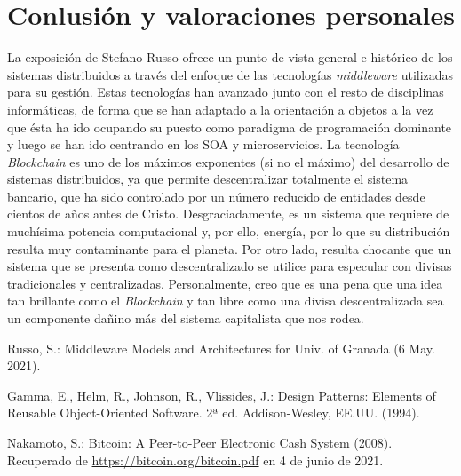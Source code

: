 \documentclass[runningheads]{llncs}
\begin{document}
\section{Conlusión y valoraciones personales}

La exposición de Stefano Russo ofrece un punto de vista general e histórico de los sistemas distribuidos a través del enfoque de las tecnologías \textit{middleware} utilizadas para su gestión.
Estas tecnologías han avanzado junto con el resto de disciplinas informáticas, de forma que se han adaptado a la orientación a objetos a la vez que ésta ha ido ocupando su puesto como paradigma de programación dominante y luego se han ido centrando en los SOA y microservicios.
La tecnología \textit{Blockchain} es uno de los máximos exponentes (si no el máximo) del desarrollo de sistemas distribuidos, ya que permite descentralizar totalmente el sistema bancario, que ha sido controlado por un número reducido de entidades desde cientos de años antes de Cristo.
Desgraciadamente, es un sistema que requiere de muchísima potencia computacional y, por ello, energía, por lo que su distribución resulta muy contaminante para el planeta.
Por otro lado, resulta chocante que un sistema que se presenta como descentralizado se utilice para especular con divisas tradicionales y centralizadas.
Personalmente, creo que es una pena que una idea tan brillante como el \textit{Blockchain} y tan libre como una divisa descentralizada sea un componente dañino más del sistema capitalista que nos rodea.

\begin{thebibliography}{8}
	Russo, S.: Middleware Models and Architectures for Univ\@. of Granada (6 May. 2021).

	Gamma, E., Helm, R., Johnson, R., Vlissides, J.: Design Patterns: Elements of Reusable Object-Oriented Software. 2ª ed. Addison-Wesley, EE\@.UU\@. (1994).

	Nakamoto, S.: Bitcoin: A Peer-to-Peer Electronic Cash System (2008). Recuperado de \url{https://bitcoin.org/bitcoin.pdf} en 4 de junio de 2021.
\end{thebibliography}
\end{document}
